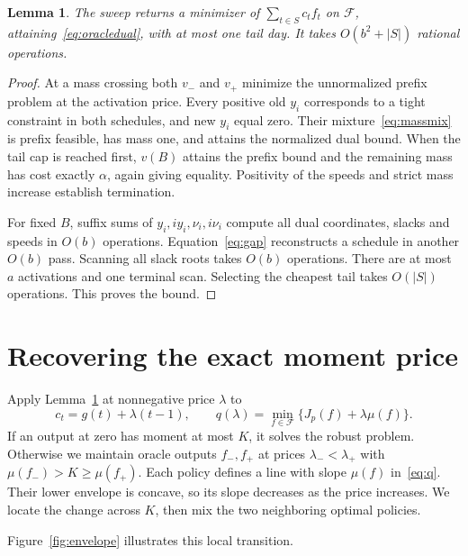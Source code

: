 \documentclass[manuscript,11pt,screen,nonacm]{acmart}
\newtheorem{lemma}[theorem]{Lemma}
\newcommand{\Q}{\mathcal F}
\begin{document}
\begin{lemma}\label{lem:oracle}
The sweep returns a minimizer of $\sum_{t\in S}c_tf_t$ on $\Q$,
attaining~\eqref{eq:oracledual}, with at most one tail day. It takes
$O(b^2+|S|)$ rational operations.
\end{lemma}
\begin{proof}
At a mass crossing both $v_-$ and $v_+$ minimize the unnormalized prefix
problem at the activation price. Every positive old $y_i$ corresponds to
a tight constraint in both schedules, and new $y_i$ equal zero. Their
mixture~\eqref{eq:massmix} is prefix feasible, has mass one, and attains
the normalized dual bound. When the tail cap is reached first, $v(B)$
attains the prefix bound and the remaining mass has cost exactly $\alpha$,
again giving equality. Positivity of the speeds and strict mass increase establish termination.

For fixed $B$, suffix sums of $y_i,iy_i,\nu_i,i\nu_i$ compute all dual
coordinates, slacks and speeds in $O(b)$ operations.
Equation~\eqref{eq:gap} reconstructs a schedule in another $O(b)$ pass.
Scanning all slack roots takes $O(b)$ operations. There are at most $a$
activations and one terminal scan. Selecting the cheapest tail takes
$O(|S|)$ operations. This proves the bound.
\end{proof}

\section{Recovering the exact moment price}\label{sec:price}
Apply Lemma~\ref{lem:oracle} at nonnegative price $\lambda$ to
\begin{equation}\label{eq:q}
 c_t=g(t)+\lambda(t-1),\qquad
 q(\lambda)=\min_{f\in\Q}\{J_p(f)+\lambda\mu(f)\}.
\end{equation}
If an output at zero has moment at most $K$, it solves the robust problem.
Otherwise we maintain oracle outputs $f_-,f_+$ at prices
$\lambda_-<\lambda_+$ with $\mu(f_-)>K\ge\mu(f_+)$.
Each policy defines a line with slope $\mu(f)$ in~\eqref{eq:q}. Their lower
envelope is concave, so its slope decreases as the price increases. We
locate the change across $K$, then mix the two neighboring optimal policies.

Figure~\ref{fig:envelope} illustrates this local transition.
\end{document}
